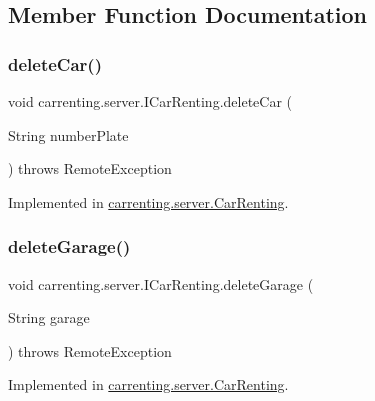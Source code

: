 \subsection{Member Function Documentation}
\mbox{\label{interfacecarrenting_1_1server_1_1_i_car_renting_ac3730576a7df8ac11f89d1cc9ad4158a}} 
\subsubsection{\texorpdfstring{deleteCar()}{deleteCar()}}
{\footnotesize\ttfamily void carrenting.\+server.\+I\+Car\+Renting.\+delete\+Car (\begin{DoxyParamCaption}\item[{String}]{number\+Plate }\end{DoxyParamCaption}) throws Remote\+Exception}



Implemented in \mbox{\hyperlink{classcarrenting_1_1server_1_1_car_renting_ab4f8e49f619868d8665ddb1fed45e398}{carrenting.\+server.\+Car\+Renting}}.

\mbox{\label{interfacecarrenting_1_1server_1_1_i_car_renting_a962ebc71ee856ffdda808876d3a26e79}} 
\subsubsection{\texorpdfstring{deleteGarage()}{deleteGarage()}}
{\footnotesize\ttfamily void carrenting.\+server.\+I\+Car\+Renting.\+delete\+Garage (\begin{DoxyParamCaption}\item[{String}]{garage }\end{DoxyParamCaption}) throws Remote\+Exception}



Implemented in \mbox{\hyperlink{classcarrenting_1_1server_1_1_car_renting_ad1b784e2383f3c5ea6de3783fe4306f7}{carrenting.\+server.\+Car\+Renting}}.

\mbox{\label{interfacecarrenting_1_1server_1_1_i_car_renting_aa4d89c769e75b73df2a85805ea90bb49}} 
